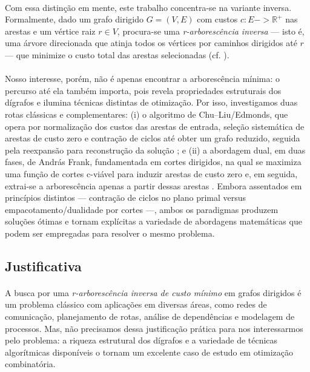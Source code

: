 \documentclass[12pt,a4paper]{article}
\def\to{->}%
\begin{document}
\paragraph{}
Com essa distinção em mente, este trabalho concentra-se na variante inversa. Formalmente, dado um grafo dirigido \(G=(V,E)\) com custos \(c:E\to\mathbb{R}^+\) nas arestas e um vértice raiz \(r\in V\), procura-se uma \textit{r-arborescência inversa} — isto é, uma árvore direcionada que atinja todos os vértices por caminhos dirigidos até \(r\) — que minimize o custo total das arestas selecionadas (cf. \cite{edmonds1967optimum,frank2014}).

\paragraph{}
Nosso interesse, porém, não é apenas encontrar a arborescência mínima: o percurso até ela também importa, pois revela propriedades estruturais dos dígrafos e ilumina técnicas distintas de otimização. Por isso, investigamos duas rotas clássicas e complementares: (i) o algoritmo de Chu--Liu/Edmonds, que opera por normalização dos custos das arestas de entrada, seleção sistemática de arestas de custo zero e contração de ciclos até obter um grafo reduzido, seguida pela reexpansão para reconstrução da solução \cite{chu1965,edmonds1967optimum}; e (ii) a abordagem dual, em duas fases, de András Frank, fundamentada em cortes dirigidos, na qual se maximiza uma função de cortes c-viável para induzir arestas de custo zero e, em seguida, extrai-se a arborescência apenas a partir dessas arestas \cite{frank2014}. Embora assentados em princípios distintos — contração de ciclos no plano primal versus empacotamento/dualidade por cortes —, ambos os paradigmas produzem soluções ótimas e tornam explícitas a variedade de abordagens matemáticas que podem ser empregadas para resolver o mesmo problema.

\subsection{Justificativa}

\paragraph{}
A busca por uma \textit{r-arborescência inversa de custo mínimo} em grafos dirigidos é um problema clássico com aplicações em diversas áreas, como redes de comunicação, planejamento de rotas, análise de dependências e modelagem de processos. Mas, não precisamos dessa justificação prática para nos interessarmos pelo problema: a riqueza estrutural dos dígrafos e a variedade de técnicas algorítmicas disponíveis o tornam um excelente caso de estudo em otimização combinatória.
\end{document}
